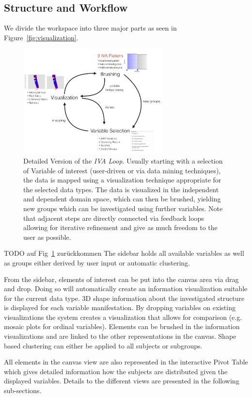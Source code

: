\documentclass[journal]{style/vgtc} 			          %
\begin{document}
\subsection{Structure and Workflow}
We divide the workspace into three major parts as seen in Figure~\ref{fig:visualization}.
%
\begin{figure}[htb]
 \centering
 \label{fig:InteractionLoop}
 \includegraphics[width=3.0in]{figures/InteractionLoop}
 \caption{Detailed Version of the \emph{IVA Loop}. Usually starting with a selection of Variable of interest (user-driven or via data mining techniques), the data is mapped using a visualization technique appropriate for the selected data types. The data is visualized in the independent and dependent domain space, which can then be brushed, yielding new groups which can be investigated using further variables. Note that adjacent steps are directly connected via feedback loops allowing for iterative refinement and give as much freedom to the user as possible.}
\end{figure}
TODO auf Fig~\ref{fig:InteractionLoop} zurückkommen
%
The sidebar holds all available variables as well as groups either derived by user input or automatic clustering.

From the sidebar, elements of interest can be put into the canvas area via drag and drop.
%
Doing so will automatically create an information visualization suitable for the current data type.
%
3D shape information about the investigated structure is displayed for each variable manifestation.
%
By dropping variables on existing visualizations the system creates a visualization that allows for comparison (e.g. mosaic plots for ordinal variables).
%
Elements can be brushed in the information visualizations and are linked to the other representations in the canvas.
%
Shape based clustering can either be applied to all subjects or subgroups.

All elements in the canvas view are also represented in the interactive Pivot Table which gives detailed information how the subjects are distributed given the displayed variables.
%
Details to the different views are presented in the following sub-sections.
\end{document}
